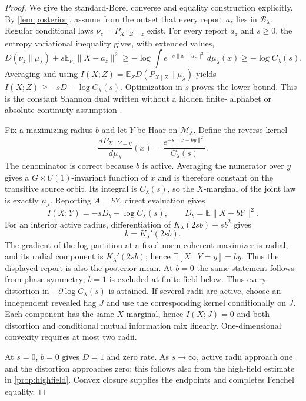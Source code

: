 \documentclass[11pt,a4paper]{article}
\newcommand{\E}{\mathbb E}
\newcommand{\M}{\mathcal M}
\newcommand{\B}{\mathcal B}
\begin{document}
\begin{proof}
We give the standard-Borel converse and equality construction explicitly.
By \cref{lem:posterior}, assume from the outset that every report
$a_z$ lies in $\B_\lambda$.
Regular conditional laws $\nu_z=P_{X\mid Z=z}$ exist.  For every report
$a_z$ and $s\ge0$, the entropy variational inequality gives, with extended
values,
\[
 D(\nu_z\|\mu_\lambda)
 +s\E_{\nu_z}\|X-a_z\|^2
 \ge-\log\int e^{-s\|x-a_z\|^2}\,d\mu_\lambda(x)
 \ge-\log C_\lambda(s).
 \tag{4.4}
\]
Averaging and using
$I(X;Z)=\E_ZD(P_{X\mid Z}\|\mu_\lambda)$ yields
$I(X;Z)\ge-sD-\log C_\lambda(s)$.  Optimization in $s$ proves the lower
bound.  This is the constant Shannon dual written without a hidden finite-
alphabet or absolute-continuity assumption
\cite{Berger1971,Csiszar1974}.

Fix a maximizing radius $b$ and let $Y$ be Haar on $\M_\lambda$.  Define
the reverse kernel
\[
 \frac{dP_{X\mid Y=y}}{d\mu_\lambda}(x)
 =\frac{e^{-s\|x-by\|^2}}{C_\lambda(s)}.
 \tag{4.5}
\]
The denominator is correct because $b$ is active.  Averaging the numerator
over $y$ gives a $G\times U(1)$-invariant function of $x$ and is therefore
constant on the transitive source orbit.  Its integral is
$C_\lambda(s)$, so the $X$-marginal of the joint law is exactly
$\mu_\lambda$.  Reporting $A=bY$, direct evaluation gives
\[
 I(X;Y)=-sD_b-\log C_\lambda(s),
 \qquad D_b=\E\|X-bY\|^2.
 \tag{4.6}
\]
For an interior active radius, differentiation of
$K_\lambda(2sb)-sb^2$ gives
\[
 b=K_\lambda'(2sb).
 \tag{4.7}
\]
The gradient of the log partition at a fixed-norm coherent maximizer is
radial, and its radial component is $K_\lambda'(2sb)$; hence
$\E[X\mid Y=y]=by$.  Thus the displayed report is also the posterior mean.
At $b=0$ the same statement follows from phase symmetry; $b=1$ is excluded
at finite field below.
Thus every distortion in $-\partial\log C_\lambda(s)$ is attained.  If
several radii are active, choose an independent revealed flag $J$ and use
the corresponding kernel conditionally on $J$.  Each component has the
same $X$-marginal, hence $I(X;J)=0$ and both distortion and conditional
mutual information mix linearly.  One-dimensional convexity requires at
most two radii.

At $s=0$, $b=0$ gives $D=1$ and zero rate.  As $s\to\infty$, active radii
approach one and the distortion approaches zero; this follows also from the
high-field estimate in \cref{prop:highfield}.  Convex closure supplies the
endpoints and completes Fenchel equality.
\end{proof}
\end{document}
